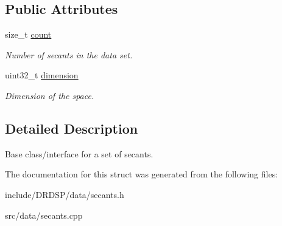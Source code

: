 \subsection*{Public Attributes}
\begin{DoxyCompactItemize}
\item 
\hypertarget{struct_d_r_d_s_p_1_1_secants_a821f5d19109ca4f94a7fb593614ac173}{size\-\_\-t \hyperlink{struct_d_r_d_s_p_1_1_secants_a821f5d19109ca4f94a7fb593614ac173}{count}}\label{struct_d_r_d_s_p_1_1_secants_a821f5d19109ca4f94a7fb593614ac173}

\begin{DoxyCompactList}\small\item\em Number of secants in the data set. \end{DoxyCompactList}\item 
\hypertarget{struct_d_r_d_s_p_1_1_secants_a950d625f7d298f93eaad20062f79db1b}{uint32\-\_\-t \hyperlink{struct_d_r_d_s_p_1_1_secants_a950d625f7d298f93eaad20062f79db1b}{dimension}}\label{struct_d_r_d_s_p_1_1_secants_a950d625f7d298f93eaad20062f79db1b}

\begin{DoxyCompactList}\small\item\em Dimension of the space. \end{DoxyCompactList}\end{DoxyCompactItemize}


\subsection{Detailed Description}
Base class/interface for a set of secants. 

The documentation for this struct was generated from the following files\-:\begin{DoxyCompactItemize}
\item 
include/\-D\-R\-D\-S\-P/data/secants.\-h\item 
src/data/secants.\-cpp\end{DoxyCompactItemize}
